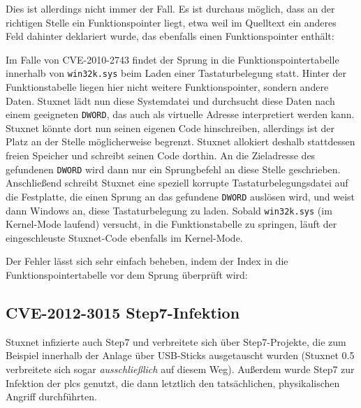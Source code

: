 \documentclass[a4paper]{article}
\begin{document}
Dies ist allerdings nicht immer der Fall.
Es ist durchaus möglich, dass an der richtigen Stelle ein Funktionspointer liegt,
etwa weil im Quelltext ein anderes Feld dahinter deklariert wurde, das ebenfalls einen Funktionspointer enthält:



Im Falle von CVE-2010-2743 findet der Sprung in die Funktionspointertabelle innerhalb von \texttt{win32k.sys} beim Laden einer Tastaturbelegung statt.
Hinter der Funktionstabelle liegen hier nicht weitere Funktionspointer, sondern andere Daten.
Stuxnet lädt nun diese Systemdatei und durchsucht diese Daten nach einem geeigneten \texttt{DWORD}, das auch als virtuelle Adresse interpretiert werden kann.
Stuxnet könnte dort nun seinen eigenen Code hinschreiben, allerdings ist der Platz an der Stelle möglicherweise begrenzt.
Stuxnet allokiert deshalb stattdessen freien Speicher und schreibt seinen Code dorthin.
An die Zieladresse des gefundenen \texttt{DWORD} wird dann nur ein Sprungbefehl an diese Stelle geschrieben.
Anschließend schreibt Stuxnet eine speziell korrupte Tastaturbelegungsdatei auf die Festplatte, die einen Sprung an das gefundene \texttt{DWORD} auslösen wird,
und weist dann Windows an, diese Tastaturbelegung zu laden.
Sobald \texttt{win32k.sys} (im Kernel-Mode laufend) versucht, in die Funktionstabelle zu springen,
läuft der eingeschleuste Stuxnet-Code ebenfalls im Kernel-Mode.

Der Fehler lässt sich sehr einfach beheben, indem der Index in die Funktionspointertabelle vor dem Sprung überprüft wird:



\subsection{CVE-2012-3015 Step7-Infektion}

Stuxnet infizierte auch Step7 und verbreitete sich über Step7-Projekte,
die zum Beispiel innerhalb der Anlage über USB-Sticks ausgetauscht wurden
(Stuxnet 0.5 verbreitete sich sogar \emph{ausschließlich} auf diesem Weg).
Außerdem wurde Step7 zur Infektion der \glspl{plc} genutzt, die dann letztlich den tatsächlichen, physikalischen Angriff durchführten.
\end{document}
